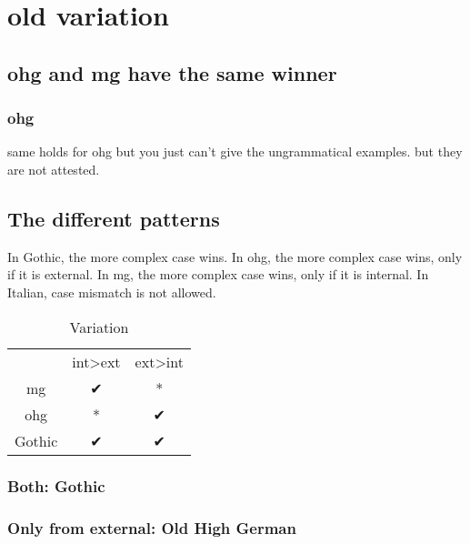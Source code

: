 \chapter*{old variation}

\section{\ac{ohg} and \ac{mg} have the same winner}


\subsection{\ac{ohg}}

same holds for \ac{ohg} but you just can't give the ungrammatical examples. but they are not attested.



\section{The different patterns}

In Gothic, the more complex case wins.
In \ac{ohg}, the more complex case wins, only if it is external.
In \ac{mg}, the more complex case wins, only if it is internal.
In Italian, case mismatch is not allowed.


\begin{table}[H]
	\center
	\caption {Variation}
		\begin{tabular}{ccc}
		\toprule
		 					& \ac{int}>\ac{ext}		& \ac{ext}>\ac{int}	\\
								\cmidrule{2-3}
		\ac{mg} 	& ✔			 							&	*									\\
		\ac{ohg}	& *										&	✔									\\
		Gothic		&	✔										&	✔									\\
		\bottomrule
		\end{tabular}
\end{table}



\subsection{Both: Gothic}









 \subsection{Only from external: Old High German}


